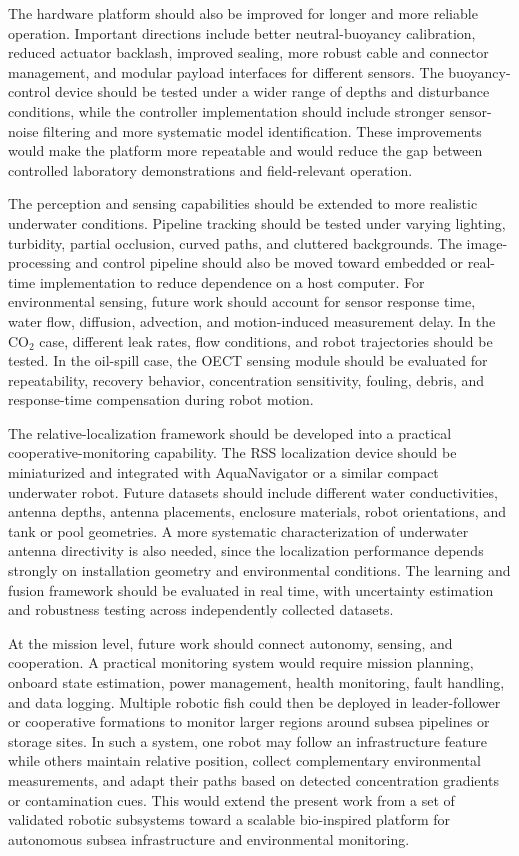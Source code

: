 \documentclass{uhcoethesis}
\begin{document}
The hardware platform should also be improved for longer and more reliable operation. Important directions include better neutral-buoyancy calibration, reduced actuator backlash, improved sealing, more robust cable and connector management, and modular payload interfaces for different sensors. The buoyancy-control device should be tested under a wider range of depths and disturbance conditions, while the controller implementation should include stronger sensor-noise filtering and more systematic model identification. These improvements would make the platform more repeatable and would reduce the gap between controlled laboratory demonstrations and field-relevant operation.

The perception and sensing capabilities should be extended to more realistic underwater conditions. Pipeline tracking should be tested under varying lighting, turbidity, partial occlusion, curved paths, and cluttered backgrounds. The image-processing and control pipeline should also be moved toward embedded or real-time implementation to reduce dependence on a host computer. For environmental sensing, future work should account for sensor response time, water flow, diffusion, advection, and motion-induced measurement delay. In the \mbox{CO$_2$} case, different leak rates, flow conditions, and robot trajectories should be tested. In the oil-spill case, the OECT sensing module should be evaluated for repeatability, recovery behavior, concentration sensitivity, fouling, debris, and response-time compensation during robot motion.

The relative-localization framework should be developed into a practical cooperative-monitoring capability. The RSS localization device should be miniaturized and integrated with AquaNavigator or a similar compact underwater robot. Future datasets should include different water conductivities, antenna depths, antenna placements, enclosure materials, robot orientations, and tank or pool geometries. A more systematic characterization of underwater antenna directivity is also needed, since the localization performance depends strongly on installation geometry and environmental conditions. The learning and fusion framework should be evaluated in real time, with uncertainty estimation and robustness testing across independently collected datasets.

At the mission level, future work should connect autonomy, sensing, and cooperation. A practical monitoring system would require mission planning, onboard state estimation, power management, health monitoring, fault handling, and data logging. Multiple robotic fish could then be deployed in leader-follower or cooperative formations to monitor larger regions around subsea pipelines or storage sites. In such a system, one robot may follow an infrastructure feature while others maintain relative position, collect complementary environmental measurements, and adapt their paths based on detected concentration gradients or contamination cues. This would extend the present work from a set of validated robotic subsystems toward a scalable bio-inspired platform for autonomous subsea infrastructure and environmental monitoring.
\end{document}
